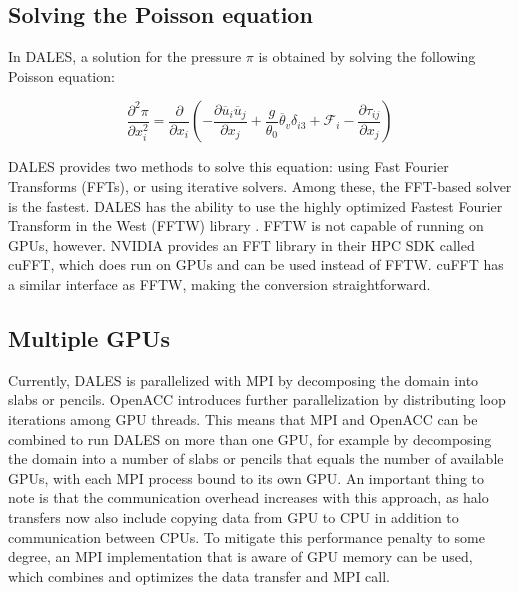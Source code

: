 \subsection{Solving the Poisson equation}

In DALES, a solution for the pressure $\pi$ is obtained by solving the following Poisson equation:

\begin{equation}
    \frac{\partial^2 \pi}{\partial x_i^2} = \frac{\partial }{\partial x_i} \left( - \frac{\partial \overline{u}_i \overline{u}_j}{\partial x_j} + \frac{g}{\theta_0}\overline{\theta}_v\delta_{i3} + \mathcal{F}_i - \frac{\partial \tau_{ij}}{\partial x_j} \right) \label{eq:pressure}
\end{equation}

DALES provides two methods to solve this equation: using Fast Fourier Transforms (FFTs), or using iterative solvers. Among these, the FFT-based solver is the fastest. DALES has the ability to use the highly optimized Fastest Fourier Transform in the West (FFTW) library \citep{FFTW97}. FFTW is not capable of running on GPUs, however. NVIDIA provides an FFT library in their HPC SDK called cuFFT, which does run on GPUs and can be used instead of FFTW. cuFFT has a similar interface as FFTW, making the conversion straightforward.

\subsection{Multiple GPUs}
Currently, DALES is parallelized with MPI by decomposing the domain into slabs or pencils. OpenACC introduces further parallelization by distributing loop iterations among GPU threads. This means that MPI and OpenACC can be combined to run DALES on more than one GPU, for example by decomposing the domain into a number of slabs or pencils that equals the number of available GPUs, with each MPI process bound to its own GPU. An important thing to note is that the communication overhead increases with this approach, as halo transfers now also include copying data from GPU to CPU in addition to communication between CPUs. To mitigate this performance penalty to some degree, an MPI implementation that is aware of GPU memory can be used, which combines and optimizes the data transfer and MPI call.


